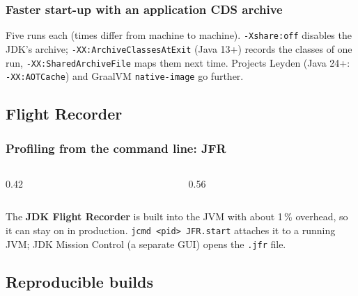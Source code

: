 \documentclass[aspectratio=169,10pt,compress]{beamer}
\begin{document}
\begin{frame}[t,fragile] \frametitle{Faster start-up with an application CDS archive}

  \vspace{0.1em}
  \small
  Five runs each (times differ from machine to machine). \texttt{-Xshare:off} disables the JDK's archive;
  \texttt{-XX:ArchiveClassesAtExit} (Java 13+) records the classes of one run, \texttt{-XX:SharedArchiveFile} maps them next time.
  Projects Leyden (Java 24+: \texttt{-XX:AOTCache}) and GraalVM \texttt{native-image} go further.
\end{frame}

\subsection[JFR]{Flight Recorder}




\begin{frame}[t,fragile] \frametitle{Profiling from the command line: JFR}
  \begin{columns}[T]
    \begin{column}{0.42\textwidth}
    \end{column}
    \begin{column}{0.56\textwidth}
    \end{column}
  \end{columns}

  \vspace{0.1em}
  \small The \textbf{JDK Flight Recorder} is built into the JVM with about 1\,\% overhead, so it can stay on in production.
  \texttt{jcmd <pid> JFR.start} attaches it to a running JVM; JDK Mission Control (a separate GUI) opens the \texttt{.jfr} file.
\end{frame}


\subsection[Reproducible]{Reproducible builds}
\end{document}
